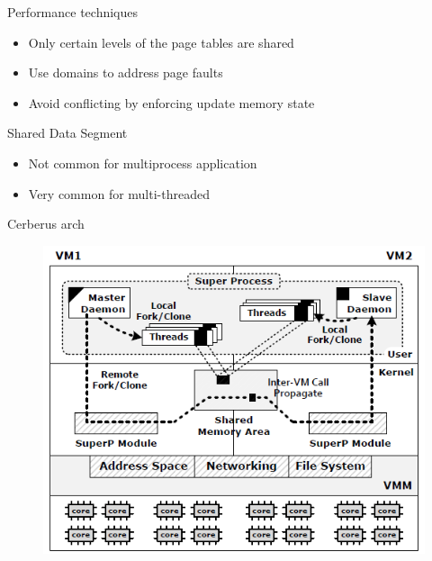 \documentclass{beamer}
\begin{document}
	\begin{frame}{Performance techniques}

	\begin{itemize}
	\item Only certain levels of the page tables are shared
	\item Use domains to address page faults
	\item Avoid conflicting by enforcing update memory state
	\end{itemize}
	
	\end{frame}
	
	\begin{frame}{Shared Data Segment}
	
	\begin{itemize}	
		\item Not common for multiprocess application
		\item Very common for multi-threaded
	\end{itemize}	
		
	\end{frame}

	\begin{frame}{Cerberus arch}

		\begin{figure} [H]
			\centering
			\includegraphics[scale=0.40]{img/cerberus-architecture}
		\end{figure}	

	\end{frame}
\end{document}
